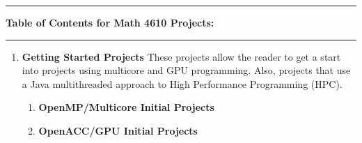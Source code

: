 \documentclass[10pt,fleqn]{article}
\begin{document}
\vskip0.1in\hrule\vskip0.1in
\noindent
{\bf Table of Contents for Math 4610 Projects:}
\vskip0.1in\hrule\vskip0.1in
\noindent
\begin{enumerate}
  \item {\bf Getting Started Projects} These projects allow the reader to get a
        start into projects using multicore and GPU programming. Also, projects
        that use a Java multithreaded approach to High Performance Programming
        (HPC). 
    \begin{enumerate}
      \item {\bf OpenMP/Multicore Initial Projects} 
      \item {\bf OpenACC/GPU Initial Projects} 

\end{enumerate}
\end{enumerate}
\end{document}
